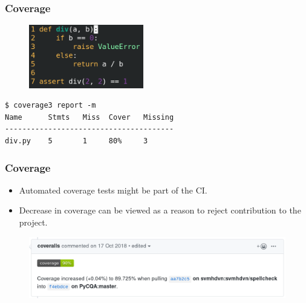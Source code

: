 \documentclass[aspectratio=169]{beamer}
\begin{document}
\begin{frame}[fragile]
	\frametitle{Coverage}
	
	\begin{figure}[ht!]
	\begin{center}
  	  \includegraphics[width=5cm]{img/coverage-test.png}
	\end{center}
	\end{figure}
	
\begin{center}
\begin{lstlisting}[frame=none, basicstyle=\ttfamily\small, columns=fullflexible, keepspaces=true]
$ coverage3 report -m
Name      Stmts   Miss  Cover   Missing
---------------------------------------
div.py    5       1     80%     3
\end{lstlisting}
	
\color{red}{Resulting coverage is 80 \% because 1 of 5 statements is not covered.}
\end{center}
\end{frame}

\begin{frame}
	\frametitle{Coverage}
	
	\begin{block}{}
		\begin{itemize}
			\item Automated coverage tests might be part of the CI.
			\item Decrease in coverage can be viewed as a reason to reject contribution to the project.
		\end{itemize}
	\end{block}
	
	\begin{figure}[ht!]
	\begin{center}
  	  \includegraphics[width=12.5cm]{img/coverage-bot.png}
	\end{center}
	\end{figure}
\end{frame}
\end{document}
